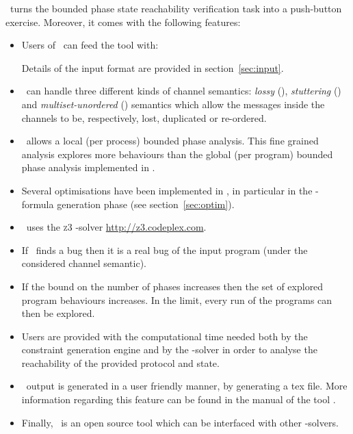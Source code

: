 \MPass\ turns the bounded phase state reachability verification task into a push-button exercise.
Moreover, it comes with the following features:

\begin{itemize}
\item Users of \MPass\ can feed the tool with:
Details of the input format are provided in section~\ref{sec:input}.
%
\item \MPass\ can handle three different kinds of channel semantics: {\it lossy} (\Lcs), {\it stuttering} (\Slcs) and {\it multiset-unordered} (\Ucs) semantics which allow the messages inside the channels to be, respectively, lost, duplicated or re-ordered.
\item \MPass\ allows a local (per process) bounded phase analysis.
This fine grained analysis explores more behaviours than the global (per program) bounded phase analysis implemented in \alternator.
%
\item Several optimisations have been implemented in \MPass, in particular in the \Smt-formula generation phase (see section~\ref{sec:optim}).
%
\item \MPass\ uses the \textsc{z3} \Smt-solver \url{http://z3.codeplex.com}.
\item If \MPass\ finds a bug then it is a real bug of the input program (under the considered channel semantic).
%
\item If the bound on the number of phases increases then the set of explored program behaviours increases.
In the limit, every run of the programs can then be explored.
\item Users are provided with the computational time needed both by the constraint generation engine and by
  the \Smt-solver in order to analyse the reachability of the provided protocol and state.
%
\item \MPass\ output is generated in a user friendly manner, by generating a tex file.
More information regarding this feature can be found in the manual of the tool \cite{github.MPass}.
%
\item Finally, \MPass\ is an open source tool which can be interfaced with other \Smt-solvers.
\end{itemize}



